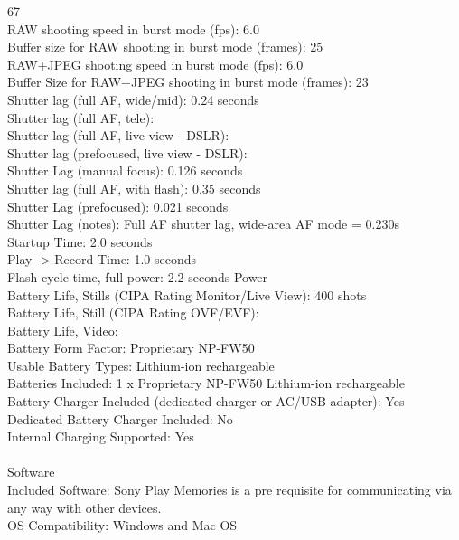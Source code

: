 \documentclass[12pt]{report}
\begin{document}
67
\\RAW shooting speed in burst mode (fps):
6.0
\\Buffer size for RAW shooting in burst mode (frames):
25
\\RAW+JPEG shooting speed in burst mode (fps):
6.0
\\Buffer Size for RAW+JPEG shooting in burst mode (frames):
23
\\Shutter lag (full AF, wide/mid):
0.24 seconds
\\Shutter lag (full AF, tele):
\\Shutter lag (full AF, live view - DSLR):
\\Shutter lag (prefocused, live view - DSLR):
\\Shutter Lag (manual focus):
0.126 seconds
\\Shutter lag (full AF, with flash):
0.35 seconds
\\Shutter Lag (prefocused):
0.021 seconds
\\Shutter Lag (notes):
Full AF shutter lag, wide-area AF mode = 0.230s
\\Startup Time:
2.0 seconds
\\Play -> Record Time:
1.0 seconds
\\Flash cycle time, full power:
2.2 seconds
Power
\\Battery Life, Stills (CIPA Rating Monitor/Live View):
400 shots 
\\Battery Life, Still (CIPA Rating OVF/EVF):
\\Battery Life, Video:
\\Battery Form Factor:
Proprietary NP-FW50
\\Usable Battery Types:
Lithium-ion rechargeable
\\Batteries Included:
1 x Proprietary NP-FW50 Lithium-ion rechargeable 
\\Battery Charger Included (dedicated charger or AC/USB adapter):
Yes
\\Dedicated Battery Charger Included:
No
\\Internal Charging Supported:
Yes
\\  \\Software
\\Included Software:
Sony Play Memories is a pre requisite for communicating via any way with other devices. 
\\OS Compatibility:
Windows and Mac OS
\end{document}
